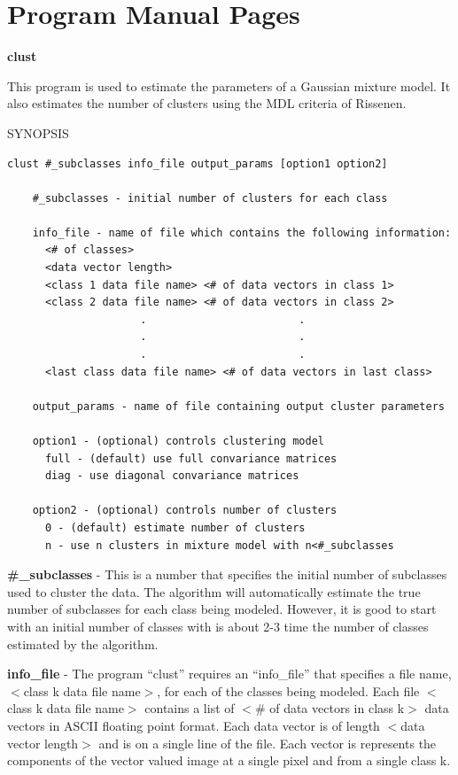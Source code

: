\documentclass[12pt]{article}
\begin{document}
\clearpage
\newpage

\section{Program Manual Pages}
\label{sec:C_manual}


\begin{description}
\item {\bf clust}

This program is used to estimate the parameters
of a Gaussian mixture model.
It also estimates the number of clusters using 
the MDL criteria of Rissenen.

\item SYNOPSIS
\begin{verbatim}
clust #_subclasses info_file output_params [option1 option2]

    #_subclasses - initial number of clusters for each class

    info_file - name of file which contains the following information:
      <# of classes>
      <data vector length>
      <class 1 data file name> <# of data vectors in class 1>
      <class 2 data file name> <# of data vectors in class 2>
                     .                        .
                     .                        .
                     .                        .
      <last class data file name> <# of data vectors in last class>

    output_params - name of file containing output cluster parameters

    option1 - (optional) controls clustering model
      full - (default) use full convariance matrices
      diag - use diagonal convariance matrices

    option2 - (optional) controls number of clusters
      0 - (default) estimate number of clusters
      n - use n clusters in mixture model with n<#_subclasses
\end{verbatim}

\begin{description}

\item {\bf \#\_subclasses} - 
This is a number that specifies
the initial number of subclasses used to cluster the data.
The algorithm will automatically estimate the true number
of subclasses for each class being modeled.
However, it is good to start with an initial number of classes
with is about 2-3 time the number of classes estimated by the algorithm.

\item {\bf info\_file} - 
The program ``clust'' requires an ``info\_file'' that 
specifies a file name, $<$class k data file name$>$,
for each of the classes being modeled. 
Each file $<$class k data file name$>$ contains a list
of  $<$\# of data vectors in class k$>$ data vectors in ASCII
floating point format. Each data vector is
of length $<$data vector length$>$ and is on a single
line of the file.
Each vector is represents the components of the 
vector valued image at a single pixel and from a single
class k.


\end{description}
\end{description}
\end{document}
